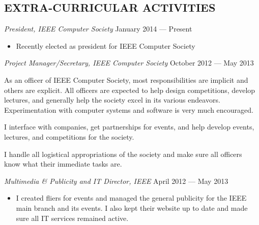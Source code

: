 \documentclass[margin]{res}
\begin{document}
\begin{resume}
  \section{EXTRA-CURRICULAR ACTIVITIES}             
  {\sl President, IEEE Computer Society}
  \hfill January 2014 --- Present \\
  \begin{itemize} 
  \item Recently elected as president for IEEE Computer Society
  \end{itemize} 
  {\sl Project Manager/Secretary, IEEE Computer Society}
  \hfill October 2012 --- May 2013 \\
  \vspace{-0.75em}
  \begin{adjustwidth}{1.5em}{0pt}
    As an officer of IEEE Computer Society, most responsibilities are
    implicit and others are explicit. All officers are expected to
    help design competitions, develop lectures, and generally help the
    society excel in its various endeavors. Experimentation with
    computer systems and software is very much encouraged.
      \begin{description}[leftmargin=1.5em] 
      \item [Project Manager] I interface with companies, get
        partnerships for events, and help develop events, lectures,
        and competitions for the society.
      \item [Secretary] I handle all logistical appropriations of the
        society and make sure all officers know what their immediate
        tasks are.
    \end{description}     
  \end{adjustwidth}
  {\sl Multimedia \& Publicity and IT Director, IEEE} 
  \hfill April 2012 --- May 2013 \\
  \begin{itemize}
  \item I created fliers for events and managed the general publicity
    for the IEEE main branch and its events. I also kept their
    website up to date and made sure all IT services remained active.
  \end{itemize} 
\end{resume}
\end{document}
